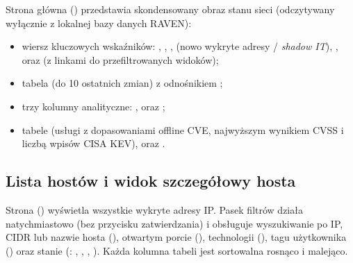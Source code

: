 \documentclass[10pt,a4paper]{article}
\begin{document}
Strona główna  (\code{/}) przedstawia skondensowany obraz stanu sieci (odczytywany wyłącznie z lokalnej bazy danych RAVEN):
\begin{itemize}
  \item wiersz kluczowych wskaźników: , , ,  (nowo wykryte adresy / \emph{shadow IT}), ,  oraz  (z linkami do przefiltrowanych widoków);
  \item tabela  (do 10 ostatnich zmian) z odnośnikiem ;
  \item trzy kolumny analityczne: ,  oraz ;
  \item tabele  (usługi z dopasowaniami offline CVE, najwyższym wynikiem CVSS i liczbą wpisów CISA KEV),  oraz .
\end{itemize}


\subsection{Lista hostów i widok szczegółowy hosta}

Strona  () wyświetla wszystkie wykryte adresy IP. Pasek filtrów działa natychmiastowo (bez przycisku zatwierdzania) i obsługuje wyszukiwanie po IP, CIDR lub nazwie hosta (), otwartym porcie (), technologii (), tagu użytkownika () oraz stanie (: , , , ). Każda kolumna tabeli jest sortowalna rosnąco i malejąco.

\end{document}
